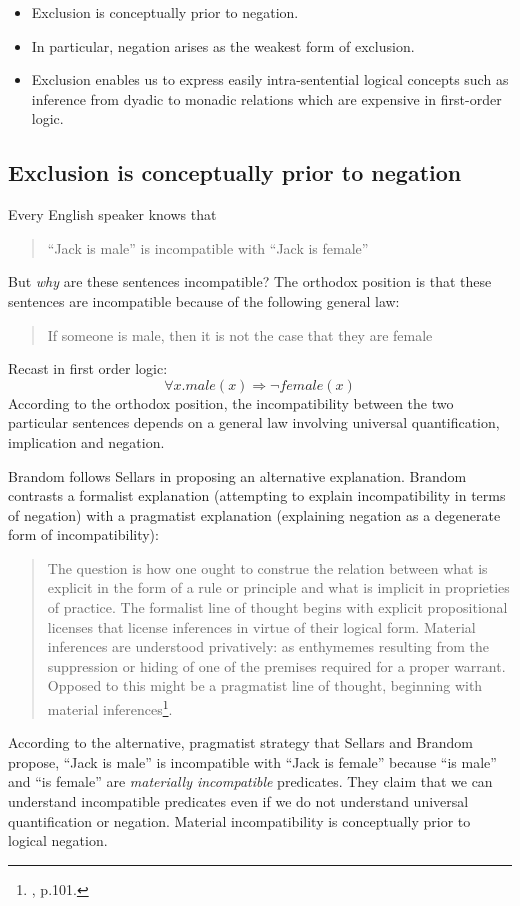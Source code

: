 \begin{itemize}

\item Exclusion is conceptually prior to negation.

\item In particular, negation arises as the weakest form of exclusion.

\item Exclusion enables us to express easily intra-sentential logical
  concepts such as inference from dyadic to monadic relations which
  are expensive in first-order logic.

\end{itemize}

\subsection{Exclusion is conceptually prior to negation}

\NI Every English speaker knows that
\begin{quote}
``Jack is male'' is incompatible with ``Jack is female''
\end{quote}

\NI But \emph{why} are these sentences incompatible? The orthodox
position is that these sentences are incompatible because of the
following general law:
\begin{quote}
If someone is male, then it is not the case that they are female
\end{quote}
Recast in first order logic:
\[
\forall x. male(x) \Rightarrow \neg female(x)
\]
According to the orthodox position, the incompatibility between the
two particular sentences depends on a general law involving universal
quantification, implication and negation.

Brandom \cite{brandom2} follows Sellars in proposing an alternative explanation.
Brandom contrasts a formalist explanation (attempting to explain incompatibility in terms of negation) with a pragmatist explanation (explaining negation as a degenerate form of incompatibility):
\begin{quote}
The question is how one ought to construe the relation between what is explicit in the form of a rule or principle and what is implicit in proprieties of practice. 
The formalist line of thought begins with explicit propositional licenses that license inferences in virtue of their logical form. Material inferences are understood privatively: as enthymemes resulting from the suppression or hiding of one of the premises required for a proper warrant. 
Opposed to this might be a pragmatist line of thought, beginning with material inferences\footnote{\cite{brandom2}, p.101.}.
\end{quote}
According to the alternative, pragmatist strategy that Sellars and Brandom propose, 
``Jack
is male'' is incompatible with ``Jack is female'' because ``is male''
and ``is female'' are \emph{materially incompatible} predicates.  They
claim that we can understand incompatible predicates even if we do
not understand universal quantification or negation.  
Material incompatibility is conceptually prior to logical negation.

